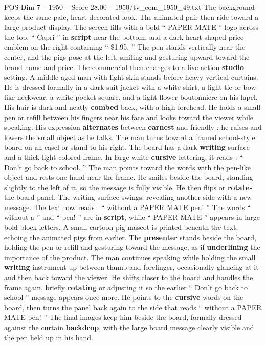\begin{textsample}{POS Dim 7 – 1950 – Score 28.00 – 1950/tv\_com\_1950\_49.txt}
The background keeps the same pale, heart-decorated look.
The animated pair then ride toward a large product display.
The screen fills with a bold “ PAPER MATE ” logo across the top, “ Capri ” in \textbf{script} near the bottom, and a dark heart-shaped price emblem on the right containing “ \$1.95. ” The pen stands vertically near the center, and the pigs pose at the left, smiling and gesturing upward toward the brand name and price.
The commercial then changes to a live-action \textbf{studio} setting.
A middle-aged man with light skin stands before heavy vertical curtains.
He is dressed formally in a dark suit jacket with a white shirt, a light tie or bow-like neckwear, a white pocket square, and a light flower boutonniere on his lapel.
His hair is dark and neatly \textbf{combed} back, with a high forehead.
He holds a small pen or refill between his fingers near his face and looks toward the viewer while speaking.
His expression \textbf{alternates} between \textbf{earnest} and friendly ; he raises and lowers the small object as he talks.
The man turns toward a framed school-style board on an easel or stand to his right.
The board has a dark \textbf{writing} surface and a thick light-colored frame.
In large white \textbf{cursive} lettering, it reads : “ Don't go back to school. ” The man points toward the words with the pen-like object and rests one hand near the frame.
He smiles beside the board, standing slightly to the left of it, so the message is fully visible.
He then flips or \textbf{rotates} the board panel.
The writing surface swings, revealing another side with a new message.
The text now reads : “ without a PAPER MATE pen! ” The words “ without a ” and “ pen! ” are in \textbf{script}, while “ PAPER MATE ” appears in large bold block letters.
A small cartoon pig mascot is printed beneath the text, echoing the animated pigs from earlier.
The \textbf{presenter} stands beside the board, holding the pen or refill and gesturing toward the message, as if \textbf{underlining} the importance of the product.
The man continues speaking while holding the small \textbf{writing} instrument up between thumb and forefinger, occasionally glancing at it and then back toward the viewer.
He shifts closer to the board and handles the frame again, briefly \textbf{rotating} or adjusting it so the earlier “ Don't go back to school ” message appears once more.
He points to the \textbf{cursive} words on the board, then turns the panel back again to the side that reads “ without a PAPER MATE pen! ” The final images keep him beside the board, formally dressed against the curtain \textbf{backdrop}, with the large board message clearly visible and the pen held up in his hand.

\end{textsample}

